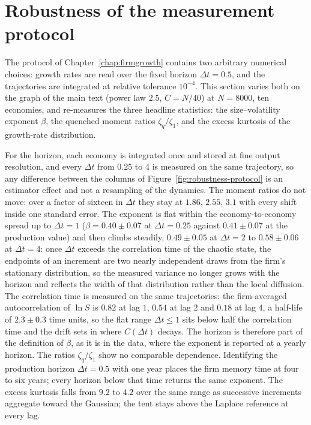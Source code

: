 \section{Robustness of the measurement protocol}
\label{sec:robustness-protocol}

The protocol of Chapter~\ref{chap:firmgrowth} contains two arbitrary numerical choices:
growth rates are read over the fixed horizon $\Delta t = 0.5$, and the trajectories are
integrated at relative tolerance $10^{-4}$. This section varies both on the graph of the
main text (power law $2.5$, $C = N/40$) at $N = 8000$, ten economies, and re-measures the
three headline statistics: the size--volatility exponent $\beta$, the quenched moment
ratios $\zeta_q/\zeta_1$, and the excess kurtosis of the growth-rate distribution.

For the horizon, each economy is integrated once and stored at fine output resolution,
and every $\Delta t$ from $0.25$ to $4$ is measured on the same trajectory, so any
difference between the columns of Figure~\ref{fig:robustness-protocol} is an estimator
effect and not a resampling of the dynamics. The moment ratios do not move: over a factor
of sixteen in $\Delta t$ they stay at $1.86,\,2.55,\,3.1$ with every shift inside one
standard error. The exponent is flat within the economy-to-economy spread up to
$\Delta t = 1$ ($\beta = 0.40 \pm 0.07$ at $\Delta t = 0.25$ against $0.41 \pm 0.07$ at
the production value) and then climbs steadily, $0.49 \pm 0.05$ at $\Delta t = 2$ to
$0.58 \pm 0.06$ at $\Delta t = 4$: once $\Delta t$ exceeds the correlation time of the
chaotic state, the endpoints of an increment are two nearly independent draws from the
firm's stationary distribution, so the measured variance no longer grows with the horizon
and reflects the width of that distribution rather than the local diffusion. The correlation time is measured
on the same trajectories: the firm-averaged autocorrelation of $\ln S$ is $0.82$ at lag
$1$, $0.54$ at lag $2$ and $0.18$ at lag $4$, a half-life of $2.3 \pm 0.3$ time units, so
the flat range $\Delta t \le 1$ sits below half the correlation time and the drift sets
in where $C(\Delta t)$ decays. The horizon is therefore part of the definition of $\beta$, as it
is in the data, where the exponent is reported at a yearly horizon. The ratios
$\zeta_q/\zeta_1$ show no comparable dependence. Identifying the production horizon
$\Delta t = 0.5$ with one year places the firm memory time at four to six years; every horizon
below that time returns the same exponent. The excess kurtosis falls from $9.2$ to $4.2$
over the same range as successive increments aggregate toward the Gaussian; the tent
stays above the Laplace reference at every lag.

